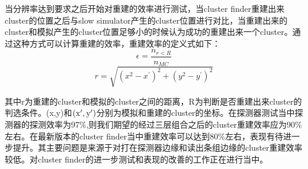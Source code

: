 当分辨率达到要求之后开始对重建的效率进行测试，当cluster finder重建出来cluster的位置之后与slow simulator产生的cluster位置进行对比，当重建出来的cluster和模拟产生的cluster位置足够小的时候认为成功的重建出来一个cluster。通过这种方式可以计算重建的效率，重建效率的定义式如下：
\begin{equation}
    \epsilon = \frac{n_{r<R}}{n_{MC}}
\end{equation}
\begin{equation}
    r = \sqrt{(x^2-x^{\prime})^2 + (y^2-y^{\prime})^2}
\end{equation}

其中r为重建的cluster和模拟的cluster之间的距离，R为判断是否重建出来cluster的判选条件。(x,y)和${\rm(x^{\prime},y^{\prime})}$分别为模拟和重建的cluster的坐标。在探测器测试当中探测器的探测效率为97\%,则我们期望的经过三层组合之后的cluster重建效率应为90\%左右。在最新版本的cluster finder当中重建效率可以达到80\%左右，表现有待进一步提升。其主要问题是来源于对打在探测器边缘和读出条组边缘的cluster重建效率较低。对cluster finder的进一步测试和表现的改善的工作正在进行当中。